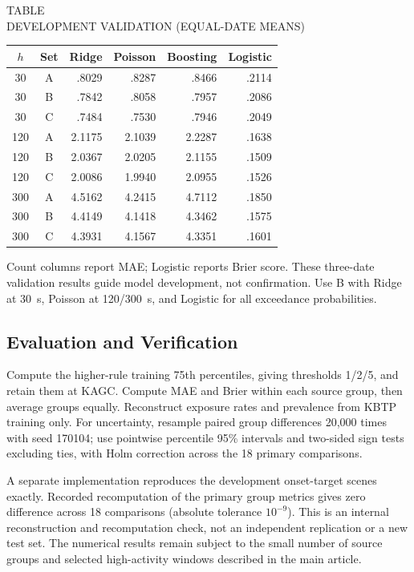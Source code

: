 \documentclass[10pt,journal,letterpaper]{IEEEtran}
\begin{document}
\begin{center}
\label{tab:validation}
TABLE \thetable\\
DEVELOPMENT VALIDATION (EQUAL-DATE MEANS)\par
\medskip
\setlength{\tabcolsep}{2pt}
\begin{tabular}{ccrrrr}
\toprule
$h$ & Set & Ridge & Poisson & Boosting & Logistic\\
\midrule
30 & A & .8029 & .8287 & .8466 & .2114\\
30 & B & .7842 & .8058 & .7957 & .2086\\
30 & C & .7484 & .7530 & .7946 & .2049\\
120 & A & 2.1175 & 2.1039 & 2.2287 & .1638\\
120 & B & 2.0367 & 2.0205 & 2.1155 & .1509\\
120 & C & 2.0086 & 1.9940 & 2.0955 & .1526\\
300 & A & 4.5162 & 4.2415 & 4.7112 & .1850\\
300 & B & 4.4149 & 4.1418 & 4.3462 & .1575\\
300 & C & 4.3931 & 4.1567 & 4.3351 & .1601\\
\bottomrule
\end{tabular}
\end{center}
Count columns report MAE; Logistic reports Brier score. These three-date validation results guide model development, not confirmation. Use B with Ridge at 30~s, Poisson at 120/300~s, and Logistic for all exceedance probabilities.

\subsection{Evaluation and Verification}
Compute the higher-rule training 75th percentiles, giving thresholds 1/2/5, and retain them at KAGC. Compute MAE and Brier within each source group, then average groups equally. Reconstruct exposure rates and prevalence from KBTP training only. For uncertainty, resample paired group differences 20,000 times with seed 170104; use pointwise percentile 95\% intervals and two-sided sign tests excluding ties, with Holm correction across the 18 primary comparisons.

A separate implementation reproduces the development onset-target scenes exactly. Recorded recomputation of the primary group metrics gives zero difference across 18 comparisons (absolute tolerance $10^{-9}$). This is an internal reconstruction and recomputation check, not an independent replication or a new test set. The numerical results remain subject to the small number of source groups and selected high-activity windows described in the main article.
\end{document}
